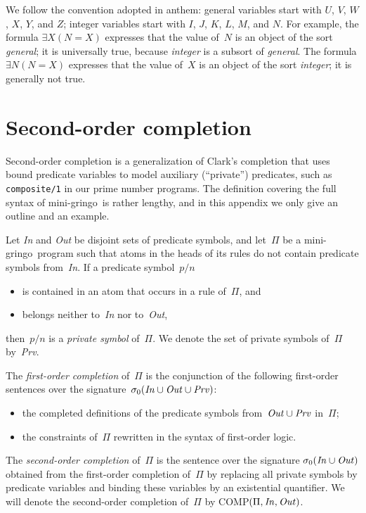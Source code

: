 \documentclass{tlp}
\def\citeb#1{(\citeauthor{#1}, \citeyear{#1})}
\def\gringo{{\sc gringo}}
\begin{document}
We follow the convention adopted in {\sc anthem\/}:
general variables start with $U$, $V$, $W$, $X$, $Y$, and $Z$;
integer variables start with $I$, $J$, $K$, $L$, $M$, and $N$.
For example, the formula
$\exists X (N=X)$ expresses that the value of~$N$ is an object of the sort
\emph{general\/};  it is universally true, because \emph{integer} is a
subsort of \emph{general}.  The formula
$\exists N (N=X)$ expresses that the value of~$X$ is an object of the sort
\emph{integer\/}; it is generally not true.

\section{Second-order completion} \label{appb}

Second-order completion \cite[Sections~6.1,~6.2]{fan20}
is a generalization of Clark's completion
that uses bound predicate variables to model auxiliary
(``private'') predicates, such as \verb|composite/1| in our prime number
programs.  The definition covering the full
syntax of mini-\gringo\ is rather lengthy, and in this appendix we only give
an outline and an example.

Let \emph{In} and \emph{Out} be disjoint sets of predicate symbols, and
let~$\Pi$ be a mini-\gringo\ program such that atoms in the heads of
its rules do not contain predicate symbols from~\emph{In}.
If a predicate symbol~$p/n$
\begin{itemize}
\item is contained in an atom that occurs in a rule of~$\Pi$, and
\item belongs neither to~\emph{In} nor to~\emph{Out},
\end{itemize}
then~$p/n$ is a \emph{private symbol} of~$\Pi$.  We denote the
set of private symbols of~$\Pi$ by~\emph{Prv}.

The \emph{first-order completion} of~$\Pi$ is the conjunction of the following
first-order sentences over the
signature~$\sigma_0(\emph{In\/}\cup\emph{Out\/}\cup\emph{Prv\/})$:
\begin{itemize}
\item the completed definitions of the predicate symbols
  from~$\emph{Out\/}\cup\emph{Prv\/}$ in~$\Pi$;
\item the constraints of~$\Pi$ rewritten in the syntax of first-order
  logic.
\end{itemize}
The \emph{second-order completion} of~$\Pi$ is the sentence
over the signature $\sigma_0(\emph{In\/}\cup\emph{Out\/})$ obtained from
the first-order completion of~$\Pi$ by replacing all private symbols by
predicate variables and binding these variables by an existential quantifier.
We will denote the second-order completion of~$\Pi$ by
COMP$(\Pi,\emph{In\/},\emph{Out\/})$.
\end{document}
